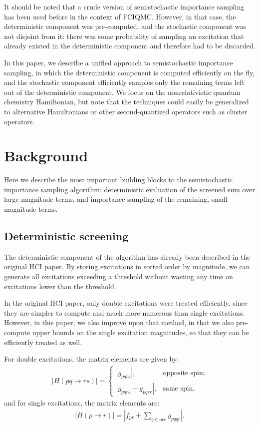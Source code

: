 \documentclass[english]{article}
\begin{document}
It should be noted that a crude version of semistochastic importance sampling has been used before in the context of FCIQMC. However, in that case, the deterministic component was pre-computed, and the stochastic component was not disjoint from it: there was some probability of sampling an excitation that already existed in the deterministic component and therefore had to be discarded.

In this paper, we describe a unified approach to semistochastic importance sampling, in which the deterministic component is computed efficiently on the fly, and the stochastic component efficiently samples only the remaining terms left out of the deterministic component. We focus on the nonrelativistic quantum chemistry Hamiltonian, but note that the techniques could easily be generalized to alternative Hamiltonians or other second-quantized operators such as cluster operators.

\section{Background}
Here we describe the most important building blocks to the semistochastic importance sampling algorithm: deterministic evaluation of the screened sum over large-magnitude terms, and importance sampling of the remaining, small-magnitude terms.

\subsection{Deterministic screening}
The deterministic component of the algorithm has already been described in the original HCI paper. By storing excitations in sorted order by magnitude, we can generate all excitations exceeding a threshold without wasting any time on excitations lower than the threshold.

In the original HCI paper, only double excitations were treated efficiently, since they are simpler to compute and much more numerous than single excitations. However, in this paper, we also improve upon that method, in that we also pre-compute upper bounds on the single excitation magnitudes, so that they can be efficiently treated as well.

For double excitations, the matrix elements are given by:
\begin{eqnarray}
	\left|H(pq\rightarrow rs)\right| = \begin{cases}
		\left|g_{pqrs}\right|, &\textrm{opposite spin};\\
		\left|g_{pqrs} - g_{pqsr}\right|,&\textrm{same spin},
	\end{cases}
\end{eqnarray}
and for single excitations, the matrix elements are:
\begin{eqnarray}
	\left|H(p\rightarrow r)\right| = \left|f_{pr} + \sum_{q\in \textrm{occ}} g_{pqqr}\right|.
\end{eqnarray}
\end{document}
